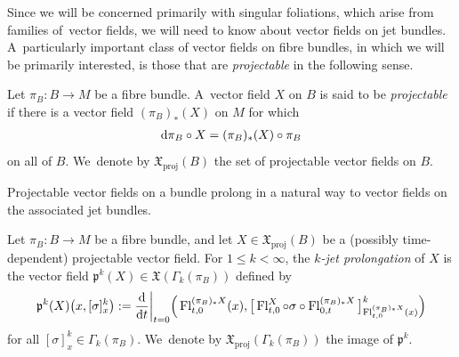 \documentclass[pdftex]{sigma}
\numberwithin{equation}{section}
\def\proj{\operatorname{proj}}
\def\Fl{\operatorname{Fl}}
\def\XF{{\mathfrak{X}}}
\def\pf{{\mathfrak{p}}}
\begin{document}
Since we will be concerned primarily with singular foliations, which arise from families of~vec\-tor fields, we will need to know about vector fields on jet bundles. A~particularly important class of vector fields on fibre bundles, in which we will be primarily interested, is those that are \textit{projectable} in the following sense.

\begin{Definition}%
Let $\pi_{B}\colon B\rightarrow M$ be a fibre bundle. A~vector field $X$ on $B$ is said to be \textit{pro\-jec\-table} if there is a vector field $(\pi_{B})_{*}(X)$ on $M$ for which
\begin{gather}\label{projectableeqn}
{\rm d}\pi_{B}\circ X = (\pi_{B})_{*}(X)\circ \pi_{B}
\end{gather}
on all of $B$. We~denote by $\XF_{\proj}(B)$ the set of projectable vector fields on $B$.
\end{Definition}

Projectable vector fields on a bundle prolong in a natural way to vector fields on the associated jet bundles.

\begin{Definition}
Let $\pi_{B}\colon B\rightarrow M$ be a fibre bundle, and let $X\in\XF_{\proj}(B)$ be a (possibly time-dependent) projectable vector field. For $1\leq k<\infty$, the \textit{$k$-jet prolongation} of $X$ is the vector field $\pf^{k}(X)\in\XF(\Gamma_{k}(\pi_{B}))$ defined by
\begin{gather*}
\pf^{k}(X)\big(x,[\sigma]^{k}_{x}\big):=\frac{\rm d}{{\rm d}t}\bigg|_{t=0}\Big(\Fl^{(\pi_{B})_{*}X}_{t,0}(x),\big[\Fl^{X}_{t,0}\circ \sigma\circ\Fl^{(\pi_{B})_{*}X}_{0,t}\big]^{k}_{\Fl^{(\pi_{B})_{*}X}_{t,0}(x)}\Big)
\end{gather*}
for all $[\sigma]^{k}_{x}\in \Gamma_{k}(\pi_{B})$. We~denote by $\XF_{\proj}(\Gamma_{k}(\pi_{B}))$ the image of $\pf^{k}$.
\end{Definition}
\end{document}
